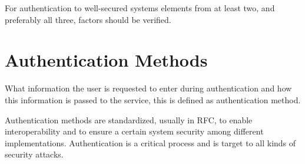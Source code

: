 For authentication to well-secured systems elements from at least two,
and preferably all three, factors should be verified.


\section{Authentication Methods}

What information the user is requested to enter during authentication
and how this information is passed to the service, this is defined as
authentication method.

Authentication methods are standardized, usually in RFC, to enable
interoperability and to ensure a certain system security among different
implementations.  Authentication is a critical process and is target to
all kinds of security attacks.

